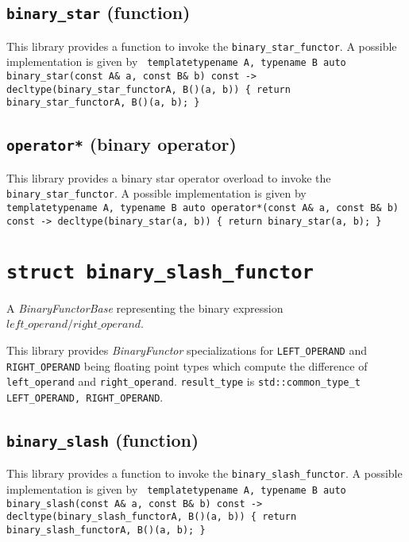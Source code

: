 \documentclass[oneside]{book}
\begin{document}
\subsection{\texttt{binary\_star} (function)}
This library provides a function to invoke the \texttt{binary\_star\_functor}.
A possible implementation is given by\newline
\texttt{
template\textlangle typename A, typename B\textrangle\newline
auto binary\_star(const A\& a, const B\& b) const -> decltype(binary\_star\_functor\textlangle A, B\textrangle()(a, b))\newline
\{ return binary\_star\_functor\textlangle A, B\textrangle()(a, b); \}
}

\subsection{\texttt{operator*} (binary operator)}
This library provides a binary star operator overload to invoke the \texttt{binary\_star\_functor}.
A possible implementation is given by\newline
\texttt{
template\textlangle typename A, typename B\textrangle\newline
auto operator*(const A\& a, const B\& b) const -> decltype(binary\_star(a, b))\newline
\{ return binary\_star(a, b); \}
}

\section{\texttt{struct binary\_slash\_functor}}
A \textit{BinaryFunctorBase} representing the binary expression $\textit{left\_operand} / \textit{right\_operand}$.\newline

\noindent{}This library provides \textit{BinaryFunctor}         specializations for
\texttt{LEFT\_OPERAND} and   \texttt{RIGHT\_OPERAND} being     floating point types
which compute the difference of \texttt{left\_operand} and \texttt{right\_operand}.
\texttt{result\_type} is \texttt{std::common\_type\_t  \textlangle   LEFT\_OPERAND,
RIGHT\_OPERAND\textrangle}.

\subsection{\texttt{binary\_slash} (function)}
This library provides a function to invoke the \texttt{binary\_slash\_functor}.
A possible implementation is given by\newline
\texttt{
template\textlangle typename A, typename B\textrangle\newline
auto binary\_slash(const A\& a, const B\& b) const -> decltype(binary\_slash\_functor\textlangle A, B\textrangle()(a, b))\newline
\{ return binary\_slash\_functor\textlangle A, B\textrangle()(a, b); \}
}
\end{document}
